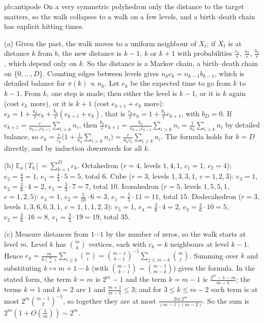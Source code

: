 \begin{solution}{pb:antipode}
\idea On a very symmetric polyhedron only the distance to the target matters, so the walk collapses to a walk on a few levels, and
a birth--death chain has explicit hitting times.

\writeup (a) Given the past, the walk moves to a uniform neighbour of $X_t$; if $X_t$ is at distance $k$ from $b$, the new distance is $k-1$, $k$ or $k+1$
with probabilities $\frac{c_k}r$, $\frac{a_k}r$, $\frac{b_k}r$, which depend only on $k$. So the distance is a Markov chain, a birth--death chain on $\{0,\dots,D\}$. Counting edges
between levels gives $n_kc_k=n_{k-1}b_{k-1}$, which is detailed balance for $\pi(k)\propto n_k$. Let $e_k$ be the expected time to go from $k$ to $k-1$. From $k$, one
step is made; then either the level is $k-1$, or it is $k$ again (cost $e_k$ more), or it is $k+1$ (cost $e_{k+1}+e_k$ more):
$e_k=1+\frac{a_k}re_k+\frac{b_k}r(e_{k+1}+e_k)$, that is $\frac{c_k}re_k=1+\frac{b_k}re_{k+1}$, with $b_D=0$. If $e_{k+1}=\frac r{n_{k+1}c_{k+1}}\sum_{i>k}n_i$, then $\frac{b_k}re_{k+1}=\frac{b_k}{n_{k+1}c_{k+1}}\sum_{i>k}n_i=\frac1{n_k}\sum_{i>k}n_i$
by detailed balance, so $e_k=\frac r{c_k}\bigl(1+\frac1{n_k}\sum_{i>k}n_i\bigr)=\frac r{n_kc_k}\sum_{i\ge k}n_i$. The formula holds for $k=D$ directly, and by induction downwards for all $k$.

(b) $\mathbb E_a[T_b]=\sum_{k=1}^De_k$. Octahedron ($r=4$, levels $1,4,1$, $c_1=1$, $c_2=4$): $e_2=\frac4{4}=1$, $e_1=\frac4{4}\cdot5=5$, total $6$. Cube ($r=3$, levels $1,3,3,1$, $c=1,2,3$):
$e_3=1$, $e_2=\frac3{6}\cdot4=2$, $e_1=\frac3{3}\cdot7=7$, total $10$. Icosahedron ($r=5$, levels $1,5,5,1$, $c=1,2,5$): $e_3=1$, $e_2=\frac5{10}\cdot6=3$, $e_1=\frac55\cdot11=11$, total $15$.
Dodecahedron ($r=3$, levels $1,3,6,6,3,1$, $c=1,1,1,2,3$): $e_5=1$, $e_4=\frac36\cdot4=2$, $e_3=\frac36\cdot10=5$, $e_2=\frac36\cdot16=8$, $e_1=\frac33\cdot19=19$, total $35$.

(c) Measure distances from $1\cdots1$ by the number of zeros, so the walk starts at level $m$. Level $k$ has $\binom mk$ vertices, each with $c_k=k$ neighbours at
level $k-1$. Hence $e_k=\frac m{k\binom mk}\sum_{i\ge k}\binom mi=\binom{m-1}{k-1}^{-1}\sum_{j\le m-k}\binom mj$. Summing over $k$ and substituting $k\mapsto m+1-k$ (with $\binom{m-1}{k-1}=\binom{m-1}{m-k}$) gives the
formula. In the stated form, the term $k=m$ is $2^m-1$ and the term $k=m-1$ is $\frac{2^m-1-m}{m-1}$; the terms $k=1$ and $k=2$ are $1$ and $\frac{m+1}{m-1}\le3$; and for
$3\le k\le m-2$ each term is at most $2^m\binom{m-1}2^{-1}$, so together they are at most $\frac{2m\,2^m}{(m-1)(m-2)}$. So the sum is $2^m(1+O(\frac1m))\sim2^m$.


\end{solution}
